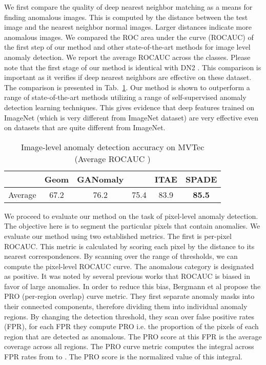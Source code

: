 \documentclass[runningheads]{llncs}
\begin{document}
We first compare the quality of deep nearest neighbor matching as a means for finding anomalous images. This is computed by the distance between the test image and the nearest neighbor normal images. Larger distances indicate more anomalous images. We compared the ROC area under the curve (ROCAUC) of the first step of our method and other state-of-the-art methods for image level anomaly detection. We report the average ROCAUC across the  classes. Please note that the first stage of our method is identical with DN2 \cite{bergman2020deep}. This comparison is important as it verifies if deep nearest neighbors are effective on these dataset. The comparison is presented in Tab.~\ref{tab:mvtec_image_table}. Our method is shown to outperform a range of state-of-the-art methods utilizing a range of self-supervised anomaly detection learning techniques. This gives evidence that deep features trained on ImageNet (which is very different from ImageNet dataset) are very effective even on datasets that are quite different from ImageNet.

\begin{table}[t]
  \centering
  \caption{Image-level anomaly detection accuracy on MVTec (Average ROCAUC )}
  \label{tab:mvtec_image_table}

    \begin{tabular}{lccccc}
    \toprule      

   & Geom \cite{golan2018deep} & GANomaly \cite{akcay2018ganomaly} &  & ITAE \cite{huang2019inverse} & SPADE\\
    \midrule
   Average & 67.2 & 76.2 & 75.4 & 83.9 & \textbf{85.5} \\
	 \bottomrule
    \end{tabular}
\end{table}

We proceed to evaluate our method on the task of pixel-level anomaly detection. The objective here is to segment the particular pixels that contain anomalies. We evaluate our method using two established metrics. The first is per-pixel ROCAUC. This metric is calculated by scoring each pixel by the distance to its  nearest correspondences. By scanning over the range of thresholds, we can compute the pixel-level ROCAUC curve. The anomalous category is designated as positive. It was noted by several previous works that ROCAUC is biased in favor of large anomalies. In order to reduce this bias, Bergmann et al \cite{bergmann2019uninformed} propose the PRO (per-region overlap) curve metric. They first separate anomaly masks into their connected components, therefore dividing them into individual anomaly regions. By changing the detection threshold, they scan over false positive rates (FPR), for each FPR they compute PRO i.e. the proportion of the pixels of each region that are detected as anomalous. The PRO score at this FPR is the average coverage across all regions. The PRO curve metric computes the integral across FPR rates from  to . The PRO score is the normalized value of this integral. 
\end{document}
